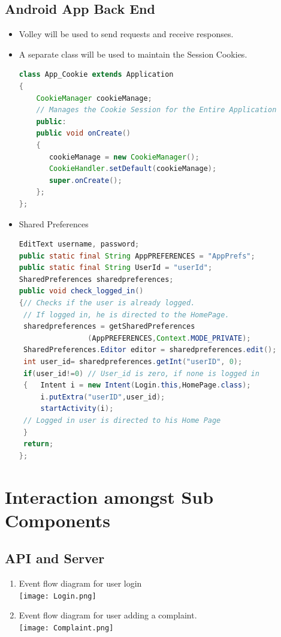 \documentclass{article}
\begin{document}
		\subsection{Android App Back End}
		\begin{itemize}
		\item Volley will be used to send requests and receive responses.
		\item A separate class will be used to maintain the Session Cookies.
		\begin{lstlisting}[language=Java, caption={App\_Cookie Class}]
class App_Cookie extends Application
{	
   	CookieManager cookieManage;
   	// Manages the Cookie Session for the Entire Application
	public:
 	public void onCreate() 
	{
       cookieManage = new CookieManager();
       CookieHandler.setDefault(cookieManage);
       super.onCreate();
   	};
};
		\end{lstlisting}

		\item Shared Preferences
\begin{lstlisting}[language=Java, caption={Persistent Login}]
EditText username, password;
public static final String AppPREFERENCES = "AppPrefs";
public static final String UserId = "userId";
SharedPreferences sharedpreferences;
public void check_logged_in()
{// Checks if the user is already logged.
 // If logged in, he is directed to the HomePage. 
 sharedpreferences = getSharedPreferences
				(AppPREFERENCES,Context.MODE_PRIVATE);
 SharedPreferences.Editor editor = sharedpreferences.edit();
 int user_id= sharedpreferences.getInt("userID", 0);
 if(user_id!=0) // User_id is zero, if none is logged in
 {   Intent i = new Intent(Login.this,HomePage.class);
     i.putExtra("userID",user_id);
     startActivity(i);
 // Logged in user is directed to his Home Page
 }
 return;
};
		\end{lstlisting}		
		\end{itemize}

	\section{Interaction amongst Sub Components}
			\subsection{API and Server}
			\begin{enumerate}
				\item Event flow diagram for user login \\
					\texttt{[image: Login.png]} \\
				\item Event flow diagram for user adding a complaint. \\
					\texttt{[image: Complaint.png]}
			\end{enumerate}
\end{document}
